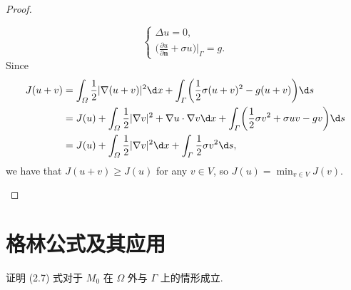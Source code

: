 \begin{proof}
\begin{description}
      \[\begin{cases}
        \Delta u = 0, \\
        \bigl(\frac{\partial u}{\partial \bm{n}} + \sigma u\bigr)\big|_{\varGamma} = g.
      \end{cases}\]
      Since
      \begin{equation}\label{eq:e12}
        \begin{aligned}
          J(u+v)
          & = \int_\varOmega \frac12 |\nabla(u+v)|^2 \d x
              + \int_\varGamma \biggl(\frac12 \sigma (u+v)^2 - g(u+v)\biggr) \d s \\
          & = J(u) + \int_\varOmega \frac12 |\nabla v|^2 + \nabla u\cdot\nabla v \d x
              + \int_\varGamma \biggl(\frac12 \sigma v^2 + \sigma uv - gv\biggr) \d s \\
          & = J(u) + \int_\varOmega \frac12 |\nabla v|^2 \d x
              + \int_\varGamma \frac12 \sigma v^2 \d s,
        \end{aligned}
      \end{equation}
      we have that $J(u+v)\geq J(u)$ for any $v\in V$, so $J(u) = \min_{v\in V} J(v)$. \qedhere
  \end{description}
\end{proof}



\section{格林公式及其应用}

\begin{exercise}
  证明 (2.7) 式对于 $M_0$ 在 $\varOmega$ 外与 $\varGamma$ 上的情形成立.
\end{exercise}

